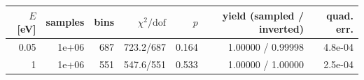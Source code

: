 \begin{tabular}{rrrrrrr}
\toprule
$E$ [eV] & samples & bins & $\chi^2/\mathrm{dof}$ & $p$ & yield (sampled / inverted) & quad. err. \\
\midrule
0.05 & 1e+06 & 687 & 723.2/687 & 0.164 & 1.00000 / 0.99998 & 4.8e-04 \\
1 & 1e+06 & 551 & 547.6/551 & 0.533 & 1.00000 / 1.00000 & 2.5e-04 \\
\bottomrule
\end{tabular}
